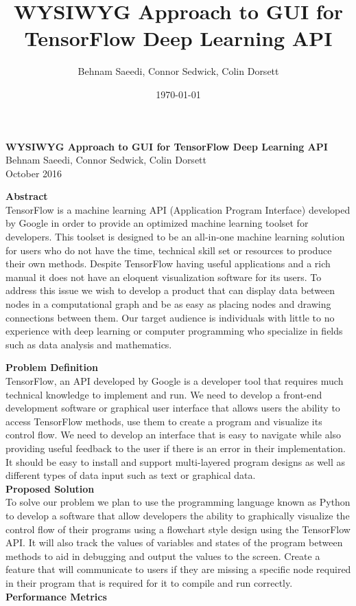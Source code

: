 \documentclass[a4paper,10pt]{IEEETran}
\title{WYSIWYG Approach to GUI for TensorFlow Deep Learning API}
\author{Behnam Saeedi, Connor Sedwick, Colin Dorsett}
\date{\today}
\newcommand*\Title{WYSIWYG Approach to GUI for TensorFlow Deep Learning API}
\newcommand*\Date{October 2016}
\newcommand*\Author{Behnam Saeedi, Connor Sedwick, Colin Dorsett}
\begin{document}
	\begin{titlepage}
		\vspace*{\fill}
			\begin{center}
				\noindent \textbf{\Huge\Title} \\
				\Large\Author \\
				\Large\Date \\
			\end{center}
			\noindent \textbf{Abstract} \\
			\indent TensorFlow is a machine learning API (Application Program Interface) developed by Google in order to provide an optimized machine learning toolset for developers.
			 This toolset is designed to be an all-in-one machine learning solution for users who do not have the time, technical skill set or resources to produce their own methods.
			 Despite TensorFlow having useful applications and a rich manual it does not have an eloquent visualization software for its users.
			 To address this issue we wish to develop a product that can display data between nodes in a computational graph and be as easy as placing nodes and drawing connections between them.
			 Our target audience is individuals with little to no experience with deep learning or computer programming who specialize in fields such as data analysis and mathematics.\\
		\vspace*{\fill}
	\end{titlepage}


	\setlength\parindent{24pt}
	\noindent \textbf{Problem Definition}\\
	\indent TensorFlow, an API developed by Google is a developer tool that requires much technical knowledge to implement and run.
	 We need to develop a front-end development software or graphical user interface that allows users the ability to access TensorFlow methods, use them to create a program and visualize its control flow.
	 We need to develop an interface that is easy to navigate while also providing useful feedback to the user if there is an error in their implementation.
	 It should be easy to install and support multi-layered program designs as well as different types of data input such as text or graphical data.\\

	\noindent \textbf{Proposed Solution}\\
	\indent To solve our problem we plan to use the programming language known as Python to develop a software that allow developers the ability to graphically visualize the control flow of their programs using a flowchart style design using the TensorFlow API.
	 It will also track the values of variables and states of the program between methods to aid in debugging and output the values to the screen.
	 Create a feature that will communicate to users if they are missing a specific node required in their program that is required for it to compile and run correctly.\\

	\noindent \textbf{Performance Metrics}\\
	\indent 
\end{document}
